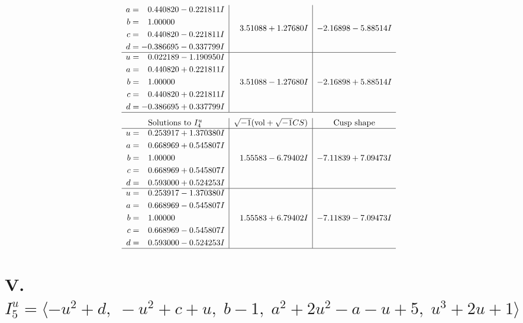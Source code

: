 \documentclass[1p]{elsarticle_modified}
\theoremstyle{definition}
\newcommand{\I}{\sqrt{-1}}
\begin{document}
$$\begin{array}{c|c|c}
\begin{aligned}
a &= \phantom{-}0.440820 - 0.221811 I \\
b &= \phantom{-}1.00000\phantom{ +0.000000I} \\
c &= \phantom{-}0.440820 - 0.221811 I \\
d &= -0.386695 - 0.337799 I\end{aligned}
 & \phantom{-}3.51088 + 1.27680 I & -2.16898 - 5.88514 I \\ \hline\begin{aligned}
u &= \phantom{-}0.022189 - 1.190950 I \\
a &= \phantom{-}0.440820 + 0.221811 I \\
b &= \phantom{-}1.00000\phantom{ +0.000000I} \\
c &= \phantom{-}0.440820 + 0.221811 I \\
d &= -0.386695 + 0.337799 I\end{aligned}
 & \phantom{-}3.51088 - 1.27680 I & -2.16898 + 5.88514 I\\
 \hline 
 \end{array}$$\newpage$$\begin{array}{c|c|c}  
\text{Solutions to }I^u_{4}& \I (\text{vol} + \sqrt{-1}CS) & \text{Cusp shape}\\
 \hline 
\begin{aligned}
u &= \phantom{-}0.253917 + 1.370380 I \\
a &= \phantom{-}0.668969 + 0.545807 I \\
b &= \phantom{-}1.00000\phantom{ +0.000000I} \\
c &= \phantom{-}0.668969 + 0.545807 I \\
d &= \phantom{-}0.593000 + 0.524253 I\end{aligned}
 & \phantom{-}1.55583 - 6.79402 I & -7.11839 + 7.09473 I \\ \hline\begin{aligned}
u &= \phantom{-}0.253917 - 1.370380 I \\
a &= \phantom{-}0.668969 - 0.545807 I \\
b &= \phantom{-}1.00000\phantom{ +0.000000I} \\
c &= \phantom{-}0.668969 - 0.545807 I \\
d &= \phantom{-}0.593000 - 0.524253 I\end{aligned}
 & \phantom{-}1.55583 + 6.79402 I & -7.11839 - 7.09473 I\\
 \hline 
 \end{array}$$\newpage\newpage\renewcommand{\arraystretch}{1}
\centering \section*{V. $I^u_{5}= \langle - u^2+d,\;- u^2+c+u,\;b-1,\;a^2+2 u^2- a- u+5,\;u^3+2 u+1 \rangle$}
\end{document}
